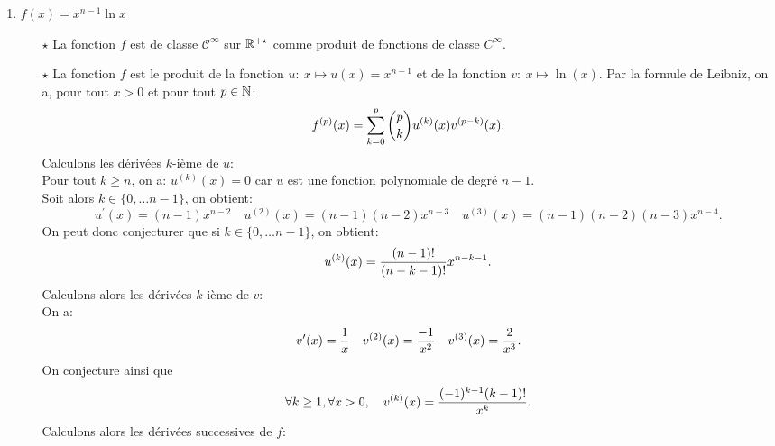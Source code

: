 \documentclass[a4paper, 11pt,reqno]{article}
\begin{document}
\begin{correction}
\begin{enumerate}
		\item $f(x)=x^{n-1}\ln{x}$
		      \begin{itemize}
			      \item[$\star$] La fonction $f$ est de classe $\mathcal{C}^{\infty}$ sur $\mathbb{R}^{+\star}$ comme produit de fonctions de classe $C^{\infty}$.
			      \item[$\star$] La fonction $f$ est le produit de la fonction $u:\ x\mapsto u(x)=x^{n-1}$ et de la fonction $v:\ x\mapsto \ln{(x)}$. Par la formule de Leibniz, on a, pour tout $x>0$ et pour tout $p\in\mathbb{N}$:
			            $$f^{(p)}(x)=\sum\limits_{k=0}^p \displaystyle \binom{p}{k} u^{(k)}(x)v^{(p-k)}(x).$$
			            Calculons les d\'eriv\'ees $k$-i\`eme de $u$:\\
			            \noindent Pour tout $k\geq n$, on a: $u^{(k)}(x)=0$ car $u$ est une fonction polynomiale de degr\'e $n-1$.\\
			            \noindent Soit alors $k\in\lbrace 0,\dots n-1\rbrace$, on obtient:
			            $$u^{\prime}(x)=(n-1)x^{n-2}\quad u^{(2)}(x)=(n-1)(n-2)x^{n-3}\quad u^{(3)}(x)=(n-1)(n-2)(n-3)x^{n-4}.$$
			            On peut donc conjecturer que si $k\in\lbrace 0,\dots n-1\rbrace$, on obtient:
			            $$u^{(k)}(x)=\displaystyle\frac{(n-1)!}{(n-k-1)!}x^{n-k-1}.$$
			            Calculons alors les d\'eriv\'ees $k$-i\`eme de $v$:\\
			            \noindent On a:
			            $$v^{\prime}(x)=\displaystyle\frac{1}{x}\quad v^{(2)}(x)=\displaystyle\frac{-1}{x^2}\quad v^{(3)}(x)=\displaystyle\frac{2}{x^3}.$$
			            On conjecture ainsi que
			            $$\forall k\geq 1,\forall x>0,\quad v^{(k)}(x)=\displaystyle\frac{(-1)^{k-1} (k-1)!}{x^k}.$$
			            Calculons alors les d\'eriv\'ees successives de $f$:

\end{itemize}
\end{enumerate}
\end{correction}
\end{document}

